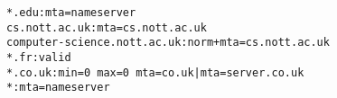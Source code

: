 \small\begin{verbatim}
*.edu:mta=nameserver
cs.nott.ac.uk:mta=cs.nott.ac.uk
computer-science.nott.ac.uk:norm+mta=cs.nott.ac.uk
*.fr:valid
*.co.uk:min=0 max=0 mta=co.uk|mta=server.co.uk
*:mta=nameserver
\end{verbatim}
